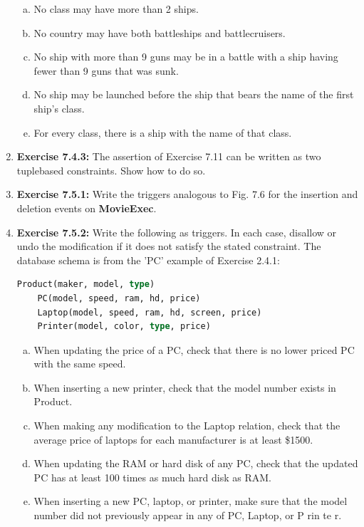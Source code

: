 \documentclass[12pt]{article}
\begin{document}
\begin{enumerate}[1.]
    \bigskip

    \begin{enumerate}[a)]
        \item No class may have more than 2 ships.
        \item No country may have both battleships and battlecruisers.
        \item No ship with more than 9 guns may be in a battle with a ship having fewer than 9 guns that was sunk.
        \item No ship may be launched before the ship that bears the name of the first ship’s class.
        \item For every class, there is a ship with the name of that class.
    \end{enumerate}

    \item \textbf{Exercise 7.4.3:} The assertion of Exercise 7.11 can be written as two tuplebased
    constraints. Show how to do so.

    \item \textbf{Exercise 7.5.1:} Write the triggers analogous to Fig. 7.6 for the insertion and
    deletion events on \textbf{MovieExec}.

    \item \textbf{Exercise 7.5.2:} Write the following as triggers. In each case, disallow or
    undo the modification if it does not satisfy the stated constraint. The database
    schema is from the 'PC' example of Exercise 2.4.1:

    \begin{lstlisting}[language=SQL]
    Product(maker, model, type)
    PC(model, speed, ram, hd, price)
    Laptop(model, speed, ram, hd, screen, price)
    Printer(model, color, type, price)
    \end{lstlisting}

    \bigskip

    \begin{enumerate}[a)]
        \item When updating the price of a PC, check that there is no lower priced PC with the same speed.
        \item When inserting a new printer, check that the model number exists in Product.
        \item When making any modification to the Laptop relation, check that the average price of laptops for each manufacturer is at least \$1500.
        \item When updating the RAM or hard disk of any PC, check that the updated PC has at least 100 times as much hard disk as RAM.
        \item When inserting a new PC, laptop, or printer, make sure that the model number did not previously appear in any of PC, Laptop, or P rin te r.
    \end{enumerate}


\end{enumerate}
\end{document}
